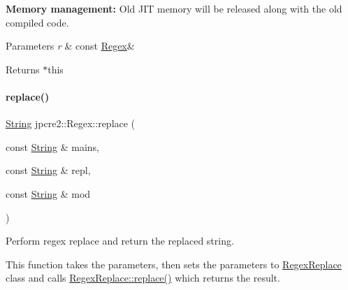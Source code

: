 {\bfseries Memory management\+:} Old J\+IT memory will be released along with the old compiled code. 
\begin{DoxyParams}{Parameters}
{\em r} & const \hyperlink{classjpcre2_1_1Regex}{Regex}\& \\
\hline
\end{DoxyParams}
\begin{DoxyReturn}{Returns}
$\ast$this 
\end{DoxyReturn}
\hypertarget{classjpcre2_1_1Regex_ac592ce7a5e4210ed5f90a0105b1f2981_ac592ce7a5e4210ed5f90a0105b1f2981}{}\label{classjpcre2_1_1Regex_ac592ce7a5e4210ed5f90a0105b1f2981_ac592ce7a5e4210ed5f90a0105b1f2981} 
\paragraph{\texorpdfstring{replace()}{replace()}\hspace{0.1cm}{\footnotesize\ttfamily [1/2]}}
{\footnotesize\ttfamily \hyperlink{namespacejpcre2_a91f03070152fb228bc116c5a737f1d16}{String} jpcre2\+::\+Regex\+::replace (\begin{DoxyParamCaption}\item[{const \hyperlink{namespacejpcre2_a91f03070152fb228bc116c5a737f1d16}{String} \&}]{mains,  }\item[{const \hyperlink{namespacejpcre2_a91f03070152fb228bc116c5a737f1d16}{String} \&}]{repl,  }\item[{const \hyperlink{namespacejpcre2_a91f03070152fb228bc116c5a737f1d16}{String} \&}]{mod }\end{DoxyParamCaption})\hspace{0.3cm}{\ttfamily [inline]}}



Perform regex replace and return the replaced string. 

This function takes the parameters, then sets the parameters to \hyperlink{classjpcre2_1_1RegexReplace}{Regex\+Replace} class and calls \hyperlink{classjpcre2_1_1RegexReplace_afd087fa7a9bfedec802d1a3dd7edbdd0_afd087fa7a9bfedec802d1a3dd7edbdd0}{Regex\+Replace\+::replace()} which returns the result.

